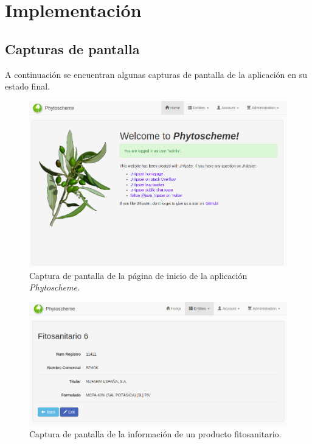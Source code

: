 \chapter{Implementación} 
\label{f.implementacion}
\section{Capturas de pantalla} 
\label{f.implementacion.capturas}
A continuación se encuentran algunas capturas de pantalla de la aplicación en su estado final. 

\par
\begin{figure}[!h]
    \centering
    \includegraphics[width=\textwidth,height=\textheight,keepaspectratio]{Imagenes/Captura1}
    \caption{Captura de pantalla de la página de inicio de la aplicación \textit{Phytoscheme}.}
    \label{fig:capturaInicio}
\end{figure}

\par
\begin{figure}[!h]
    \centering
    \includegraphics[width=\textwidth,height=\textheight,keepaspectratio]{Imagenes/Captura4}
    \caption{Captura de pantalla de la información de un producto fitosanitario.}
    \label{fig:capturaFitoDetalle}
\end{figure}



